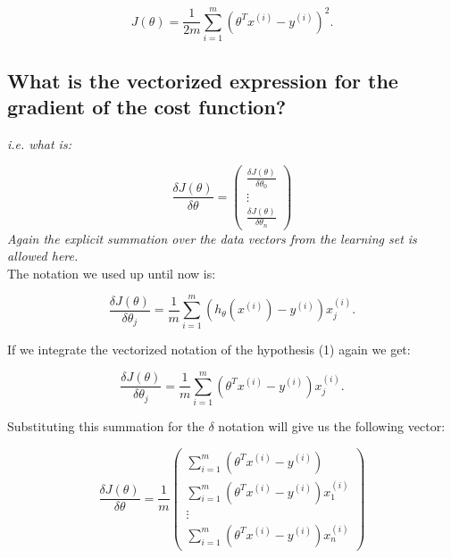 \documentclass{article}
\begin{document}
\begin{equation*}
		J(\theta) = \frac{1}{2m} \sum\limits_{i=1}^m (\theta^T x^{(i)} - y ^{(i)})^2.
\end{equation*}

\subsection{What is the vectorized expression for the gradient of the cost function?}
\textit{i.e. what is:}

\begin{equation*}
\frac{\delta J(\theta)}{\delta \theta} = \begin{pmatrix} \frac{\delta J(\theta)}{\delta \theta_0} \\ \vdots \\ \frac{\delta J(\theta)}{\delta \theta_n} \end{pmatrix}
\end{equation*}
\textit{Again the explicit summation over the data vectors from the
learning set is allowed here.}\\

The notation we used up until now is:

\begin{equation*}
\frac{\delta J(\theta)}{\delta \theta_j}= \frac{1}{m} \sum\limits_{i=1}^m (h _{\theta} (x ^{(i)}) - y ^{(i)})x_j^{(i)}.
\end{equation*}

If we integrate the vectorized notation of the hypothesis (1) again we get:

\begin{equation*}
\frac{\delta J(\theta)}{\delta \theta_j}= \frac{1}{m} \sum\limits_{i=1}^m ( \theta^T x^{(i)}  - y ^{(i)})x_j^{(i)}.
\end{equation*}

Substituting this summation for the $\delta$ notation will give us the following vector:

\begin{equation}
\frac{\delta J(\theta)}{\delta \theta} = \frac{1}{m}\begin{pmatrix}	\sum\limits_{i=1}^m ( \theta^T x^{(i)}  - y ^{(i)})\\ 
									     		\sum\limits_{i=1}^m ( \theta^T x^{(i)}  - y ^{(i)})x_1^{(i)} \\ 
										      	 \vdots \\
										 	\sum\limits_{i=1}^m ( \theta^T x^{(i)}  - y ^{(i)})x_n^{(i)}
						\end{pmatrix}
\end{equation}
\end{document}

